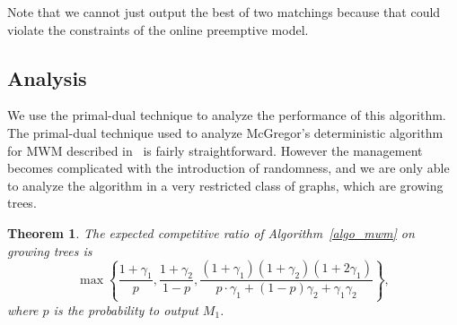 \documentclass[11pt]{article}
\newtheorem{theorem}{Theorem}
\begin{document}
 Note that we cannot just output the best of two matchings because that could violate the constraints of the online preemptive model.
\subsection{Analysis}
We use the primal-dual technique to analyze the performance of this algorithm. The primal-dual technique used to analyze McGregor's deterministic algorithm for MWM described in~\cite{sumedh} is fairly straightforward. However the management becomes complicated with the introduction of randomness, and we are only able to analyze the algorithm in a very restricted class of graphs, which are growing trees. 

\begin{theorem}\label{MWM_rand}
The expected competitive ratio of Algorithm~\ref{algo_mwm} on growing trees is
\[
\max\left\{\frac{1+\gamma_1}{p},\frac{1+\gamma_2}{1-p},\frac{(1+\gamma_1)(1+\gamma_2)(1+2\gamma_1)}{p\cdot \gamma_1 + (1-p)\gamma_2 + \gamma_1\gamma_2}\right\},
\]
where $p$ is the probability to output $M_1$.
\end{theorem}

\end{document}
